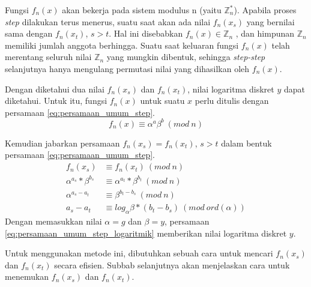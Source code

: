 Fungsi $ f_n (x) $ akan bekerja pada sistem modulus n (yaitu $ \mathbb{Z}_n^* $). Apabila proses \textit{step} dilakukan terus menerus, suatu saat akan ada nilai $ f_n (x_s) $ yang bernilai sama dengan $ f_n (x_t) $, $ s>t $. Hal ini disebabkan $ f_n (x) \in \mathbb{Z}_n $ , dan himpunan $ \mathbb{Z}_n $ memiliki jumlah anggota berhingga. Suatu saat keluaran fungsi $ f_n (x) $ telah merentang seluruh nilai $ \mathbb{Z}_n $ yang mungkin dibentuk, sehingga \textit{step-step} selanjutnya hanya mengulang permutasi nilai yang dihasilkan oleh $ f_n (x) $.\cite{brent_montecarlo}

Dengan diketahui dua nilai $ f_n (x_s) $ dan $ f_n (x_t) $, nilai logaritma diskret $ y $ dapat diketahui. Untuk itu, fungsi $ f_n (x) $ untuk suatu $ x $ perlu ditulis dengan persamaan \eqref{eq:persamaan_umum_step}.
\begin{equation}
f_n (x)\equiv \alpha^a \beta^b\ (mod\ n)
\label{eq:persamaan_umum_step}
\end{equation}

Kemudian jabarkan persamaan $ f_n (x_s)=f_n (x_t) $, $ s>t $ dalam bentuk persamaan \eqref{eq:persamaan_umum_step}.
\begin{align}
f_n (x_s) &\equiv f_n (x_t)\ (mod\ n) \\
\alpha^{a_s} * \beta^{b_s} &\equiv \alpha^{a_t} * \beta^{b_t}\ (mod\ n) \\
\alpha^{a_s-a_t} &\equiv \beta^{b_t-b_s}\ (mod\ n) \\
a_s - a_t &\equiv log_{\alpha} \beta * (b_t - b_s)\ (mod\ ord(\alpha))
\label{eq:persamaan_umum_step_logaritmik}
\end{align}
Dengan memasukkan nilai $ \alpha=g $ dan $ \beta=y $, persamaan \eqref{eq:persamaan_umum_step_logaritmik} memberikan nilai logaritma diskret $ y $.

Untuk menggunakan metode ini, dibutuhkan sebuah cara untuk mencari $ f_n (x_s) $ dan $ f_n (x_t) $ secara efisien. Subbab selanjutnya akan menjelaskan cara untuk menemukan $ f_n (x_s) $ dan $ f_n (x_t) $.

